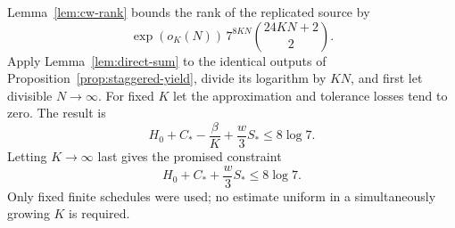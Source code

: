Lemma~\ref{lem:cw-rank} bounds the rank of the replicated source by
\[
 \exp(o_K(N))\,7^{8KN}\binom{24KN+2}{2}.
\]
Apply Lemma~\ref{lem:direct-sum} to the identical outputs of
Proposition~\ref{prop:staggered-yield}, divide its logarithm by $KN$,
and first let divisible $N\to\infty$.  For fixed $K$ let the
approximation and tolerance losses tend to zero.  The result is
\[
 H_0+C_*-\frac{\beta}{K}+\frac{w}{3}S_*\leq8\log7.
\]
Letting $K\to\infty$ last gives the promised constraint
\begin{equation}\label{eq:rank-constraint}
 \boxed{\displaystyle H_0+C_*+\frac{w}{3}S_*\leq8\log7.}
\end{equation}
Only fixed finite schedules were used; no estimate uniform in a
simultaneously growing $K$ is required.
